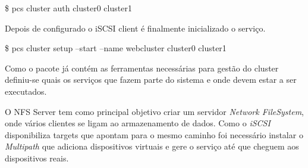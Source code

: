 \begin{MyVerbatims}
  \$ pcs cluster auth cluster0 cluster1
\end{MyVerbatims}

Depois de configurado o iSCSI client é finalmente inicializado o serviço.

\begin{MyVerbatims}
  \$ pcs cluster setup --start --name webcluster cluster0 cluster1
\end{MyVerbatims}

Como o pacote já contém as ferramentas necessárias para gestão do cluster definiu-se quais os serviços que fazem parte do sistema e onde devem estar a ser executados.

O NFS Server tem como principal objetivo criar um servidor \textit{Network FileSystem}, onde vários clientes se ligam ao armazenamento de dados.
Como o \textit{iSCSI} disponibiliza targets que apontam para o mesmo caminho foi necessário instalar o \textit{Multipath} que adiciona dispositivos virtuais e gere o serviço até que cheguem aos dispositivos reais.
